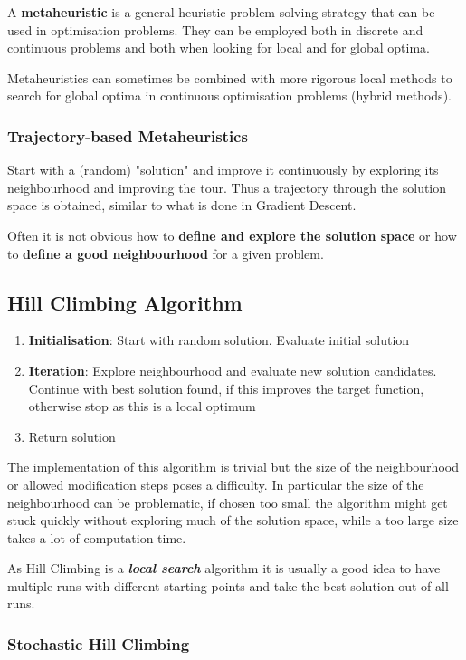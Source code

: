 \documentclass[11pt]{article}
\begin{document}
A \textbf{metaheuristic} is a general heuristic problem-solving strategy that can be used in optimisation problems. They can be employed both in discrete and continuous problems and both when looking for local and for global optima.

Metaheuristics can sometimes be combined with more rigorous local methods to search for global optima in continuous optimisation problems (hybrid methods).

\subsubsection{Trajectory-based Metaheuristics}
Start with a (random) "solution" and improve it continuously by exploring its neighbourhood and improving the tour.
Thus a trajectory through the solution space is obtained, similar to what is done in Gradient Descent.

Often it is not obvious how to \textbf{define and explore the solution space} or how to \textbf{define a good neighbourhood} for a given problem.

\subsection{Hill Climbing Algorithm}
\begin{enumerate}
	\item \textbf{Initialisation}: Start with random solution. Evaluate initial solution
	\item \textbf{Iteration}: Explore neighbourhood and evaluate new solution candidates. Continue with best solution found, if this improves the target function, otherwise stop as this is a local optimum
	\item Return solution
\end{enumerate}

The implementation of this algorithm is trivial but the size of the neighbourhood or allowed modification steps poses a difficulty. In particular the size of the neighbourhood can be problematic, if chosen too small the algorithm might get stuck quickly without exploring much of the solution space, while a too large size takes a lot of computation time.

As Hill Climbing is a \emph{\textbf{local search}} algorithm it is usually a good idea to have multiple runs with different starting points and take the best solution out of all runs.

\subsubsection{Stochastic Hill Climbing}
\end{document}
